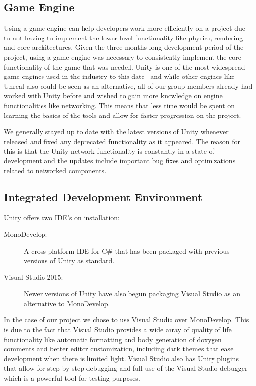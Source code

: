 \subsection{Game Engine}
Using a game engine can help developers work more efficiently on a project due to not having to implement the lower level functionality like physics, rendering and core architectures. Given the three months long development period of the project, using a game engine was necessary to consistently implement the core functionality of the game that was needed. Unity is one of the most widespread game engines used in the industry to this date~\cite{unityUsageStatistics} and while other engines like Unreal also could be seen as an alternative, all of our group members already had worked with Unity before and wished to gain more knowledge on engine functionalities like networking. This means that less time would be spent on learning the basics of the tools and allow for faster progression on the project.

We generally stayed up to date with the latest versions of Unity whenever released and fixed any deprecated functionality as it appeared. The reason for this is that the Unity network functionality is constantly in a state of development and the updates include important bug fixes and optimizations related to networked components. 
    
\subsection{Integrated Development Environment}
Unity offers two IDE's on installation:
\begin{description}
    \item[MonoDevelop: ] A cross platform IDE for C\# that has been packaged with previous versions of Unity as standard. 
    \item[Visual Studio 2015: ] Newer versions of Unity have also begun packaging Visual Studio as an alternative to MonoDevelop. 
\end{description}

In the case of our project we chose to use Visual Studio over MonoDevelop. This is due to the fact that Visual Studio provides a wide array of quality of life functionality like automatic formatting and body generation of doxygen comments and better editor customization, including dark themes that ease development when there is limited light. 
Visual Studio also has Unity plugins that allow for step by step debugging and full use of the Visual Studio debugger which is a powerful tool for testing purposes. 

